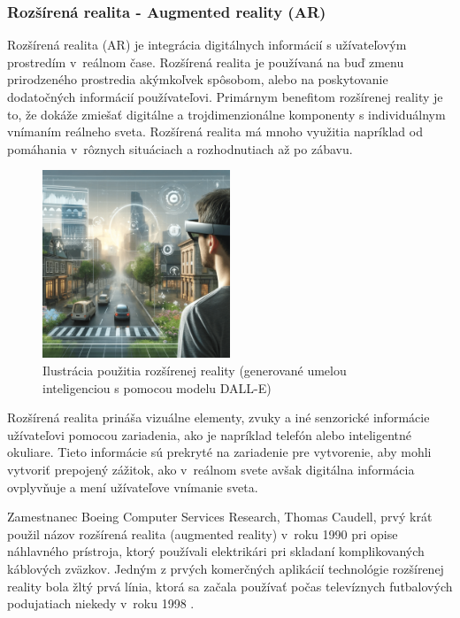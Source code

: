 \cite{gonzalez2023what}

\subsubsection{Rozšírená realita - Augmented reality (AR)}

Rozšírená realita (AR) je integrácia digitálnych informácií s užívateľovým prostredím v~reálnom čase. Rozšírená realita je používaná na buď zmenu prirodzeného prostredia akýmkoľvek spôsobom, alebo na poskytovanie dodatočných informácií používateľovi. Primárnym benefitom rozšírenej reality je to, že dokáže zmiešať digitálne a trojdimenzionálne komponenty s individuálnym vnímaním reálneho sveta. Rozšírená realita má mnoho využitia napríklad od pomáhania v~rôznych situáciach a rozhodnutiach až po zábavu.

\begin{figure}[h]
  \centering
  \includegraphics[width=0.5\textwidth]{img/rozsirena_realita.png}
  \caption{Ilustrácia použitia rozšírenej reality (generované umelou inteligenciou s pomocou modelu DALL-E)}
  \label{fig:roz_real}
\end{figure}

Rozšírená realita prináša vizuálne elementy, zvuky a iné senzorické informácie užívateľovi pomocou zariadenia, ako je napríklad telefón alebo inteligentné okuliare. Tieto informácie sú prekryté na zariadenie pre vytvorenie, aby mohli vytvoriť prepojený zážitok, ako v~reálnom svete avšak digitálna informácia ovplyvňuje a mení užívateľove vnímanie sveta. 

Zamestnanec Boeing Computer Services Research, Thomas Caudell, prvý krát použil názov rozšírená realita (augmented reality) v~roku 1990 pri opise náhlavného prístroja, ktorý používali elektrikári pri skladaní komplikovaných káblových zväzkov. Jedným z prvých komerčných aplikácií technológie rozšírenej reality bola žltý prvá línia, ktorá sa začala používať počas televíznych futbalových podujatiach niekedy v~roku 1998 \cite{gillis2024ar}. 

